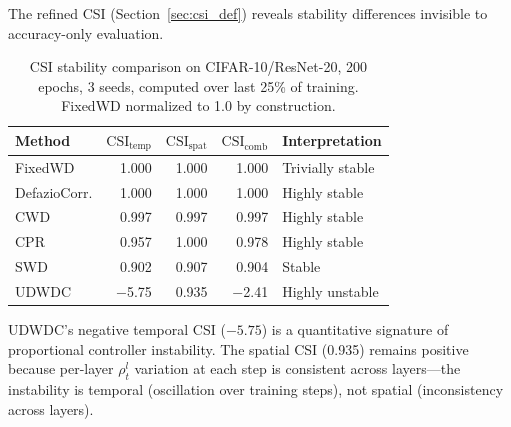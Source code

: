 \documentclass{article}
\begin{document}
The refined CSI (Section~\ref{sec:csi_def}) reveals stability differences invisible to accuracy-only evaluation.

\begin{table}[t]
\caption{CSI stability comparison on CIFAR-10/ResNet-20, 200 epochs, 3 seeds, computed over last 25\% of training. FixedWD normalized to 1.0 by construction.}
\label{tab:csi}
\centering
\begin{tabular}{lrrrl}
\toprule
Method & $\text{CSI}_{\text{temp}}$ & $\text{CSI}_{\text{spat}}$ & $\text{CSI}_{\text{comb}}$ & Interpretation \\
\midrule
FixedWD & 1.000 & 1.000 & 1.000 & Trivially stable \\
DefazioCorr. & 1.000 & 1.000 & 1.000 & Highly stable \\
CWD & 0.997 & 0.997 & 0.997 & Highly stable \\
CPR & 0.957 & 1.000 & 0.978 & Highly stable \\
SWD & 0.902 & 0.907 & 0.904 & Stable \\
UDWDC & $-$5.75 & 0.935 & $-$2.41 & Highly unstable \\
\bottomrule
\end{tabular}
\end{table}

UDWDC's negative temporal CSI ($-5.75$) is a quantitative signature of proportional controller instability. The spatial CSI (0.935) remains positive because per-layer $\rho_t^l$ variation at each step is consistent across layers---the instability is temporal (oscillation over training steps), not spatial (inconsistency across layers).
\end{document}
